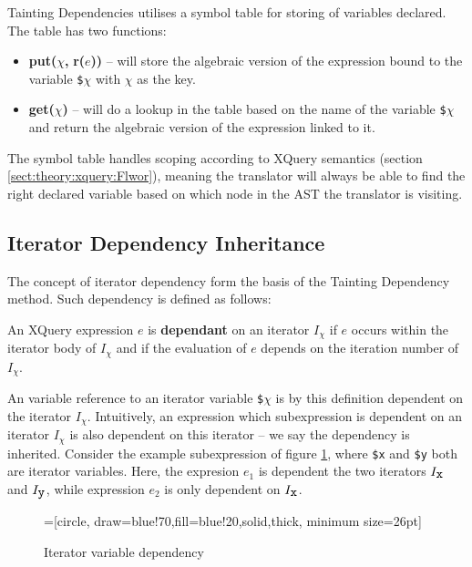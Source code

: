 Tainting Dependencies utilises a symbol table for storing of variables declared. The table has two functions:
\begin{itemize}
  \item \textbf{put(}$\chi$\textbf{, }\textbf{r(}$e$\textbf{))} -- will store the
  algebraic version of the expression bound to the variable \texttt{\$}$\chi$ with $\chi$ as the key.  
  \item \textbf{get(}$\chi$\textbf{)} -- will do a lookup in the table based on the name of the variable
  \texttt{\$}$\chi$ and return the algebraic version of the expression linked to it.
\end{itemize}
The symbol table handles scoping according to XQuery semantics (section \ref{sect:theory:xquery:Flwor}), meaning
the translator will always be able to find the right declared variable based on which node in the AST the
translator is visiting.

\subsection{Iterator Dependency Inheritance}
\label{sect:trans:TD:dependency}

The concept of iterator dependency form the basis of the Tainting Dependency method. Such dependency is
defined as follows:

\noindent
\begin{myDefinition}
An XQuery expression $e$ is \textbf{dependant} on an iterator $I_{\chi}$ if $e$ occurs within the iterator body of
$I_{\chi}$ and if the evaluation of $e$ depends on the iteration number of $I_{\chi}$.
\label{def:iterVarDep}
\end{myDefinition}

An variable reference to an iterator variable \texttt{\$}$\chi$ is by this definition dependent on the iterator
$I_{\chi}$. Intuitively, an expression which subexpression is dependent on an iterator $I_{\chi}$ is also
dependent on this iterator -- we say the dependency is inherited. Consider the example subexpression of figure
\ref{fig:trans:td:varDep}, where \texttt{\$x} and \texttt{\$y} both are iterator variables. Here, the expresion
$e_{1}$ is dependent the two iterators $I_{\mbox{\texttt{x}}}$ and $I_{\mbox{\texttt{y}}}$, while expression
$e_{2}$ is only dependent on $I_{\mbox{\texttt{x}}}$.

\begin{figure}[h]
\centering
{}=[circle, draw=blue!70,fill=blue!20,solid,thick, minimum
size=26pt]
\label{fig:trans:td:varDep}
\caption[Iterator variable dependency]{Iterator variable dependency}
\end{figure}

